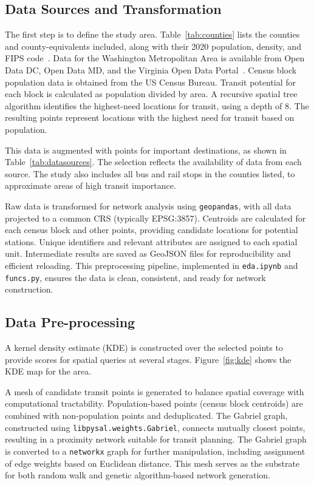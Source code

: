 \documentclass[manuscript,nonacm]{acmart}
\begin{document}
\subsection{Data Sources and Transformation}
The first step is to define the study area. Table~\ref{tab:counties} lists the counties and county-equivalents included, along with their 2020 population, density, and FIPS code~\cite{lit:census}. Data for the Washington Metropolitan Area is available from Open Data DC, Open Data MD, and the Virginia Open Data Portal~\cite{lit:opendata}. Census block population data is obtained from the US Census Bureau. Transit potential for each block is calculated as population divided by area. A recursive spatial tree algorithm identifies the highest-need locations for transit, using a depth of 8. The resulting points represent locations with the highest need for transit based on population.

This data is augmented with points for important destinations, as shown in Table~\ref{tab:datasources}. The selection reflects the availability of data from each source. The study also includes all bus and rail stops in the counties listed, to approximate areas of high transit importance.

Raw data is transformed for network analysis using \texttt{geopandas}, with all data projected to a common CRS (typically EPSG:3857). Centroids are calculated for each census block and other points, providing candidate locations for potential stations. Unique identifiers and relevant attributes are assigned to each spatial unit. Intermediate results are saved as GeoJSON files for reproducibility and efficient reloading. This preprocessing pipeline, implemented in \texttt{eda.ipynb} and \texttt{funcs.py}, ensures the data is clean, consistent, and ready for network construction.

\subsection{Data Pre-processing}

A kernel density estimate (KDE) is constructed over the selected points to provide scores for spatial queries at several stages. Figure~\ref{fig:kde} shows the KDE map for the area.

A mesh of candidate transit points is generated to balance spatial coverage with computational tractability. Population-based points (census block centroids) are combined with non-population points and deduplicated. The Gabriel graph, constructed using \texttt{libpysal.weights.Gabriel}, connects mutually closest points, resulting in a proximity network suitable for transit planning. The Gabriel graph is converted to a \texttt{networkx} graph for further manipulation, including assignment of edge weights based on Euclidean distance. This mesh serves as the substrate for both random walk and genetic algorithm-based network generation.
\end{document}
